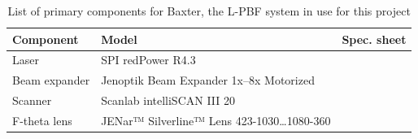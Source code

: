 \begin{table}[h]
    \centering
    \begin{tabular}{l|l|c}
        Component & Model & Spec. sheet \\
        \hline
        Laser & SPI redPower R4.3 & \cite{laser-spec}\\
        Beam expander & Jenoptik Beam Expander 1x–8x Motorized & \cite{beam-expander-spec} \\
        Scanner & Scanlab intelliSCAN III 20 & \cite{scanner-spec} \\
        F-theta lens & JENar™ Silverline™ Lens 423-1030…1080-360 & \cite{f-theta-lens-spec}
    \end{tabular}
    \caption{List of primary components for Baxter, the L-PBF system in use for this project}
    \label{tab:list-of-components}
\end{table}
